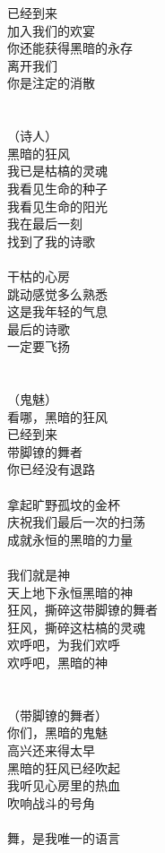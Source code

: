 已经到来\\
加入我们的欢宴\\
你还能获得黑暗的永存\\
离开我们\\
你是注定的消散\\
\\
\\
（诗人）\\
黑暗的狂风\\
我已是枯槁的灵魂\\
我看见生命的种子\\
我看见生命的阳光\\
我在最后一刻\\
找到了我的诗歌\\
\\
干枯的心房\\
跳动感觉多么熟悉\\
这是我年轻的气息\\
最后的诗歌\\
一定要飞扬\\
\\
\\
（鬼魅）\\
看哪，黑暗的狂风\\
已经到来\\
带脚镣的舞者\\
你已经没有退路\\
\\
拿起旷野孤坟的金杯\\
庆祝我们最后一次的扫荡\\
成就永恒的黑暗的力量\\
\\
我们就是神\\
天上地下永恒黑暗的神\\
狂风，撕碎这带脚镣的舞者\\
狂风，撕碎这枯槁的灵魂\\
欢呼吧，为我们欢呼\\
欢呼吧，黑暗的神\\
\\
\\
（带脚镣的舞者）\\
你们，黑暗的鬼魅\\
高兴还来得太早\\
黑暗的狂风已经吹起\\
我听见心房里的热血\\
吹响战斗的号角\\
\\
舞，是我唯一的语言\\
